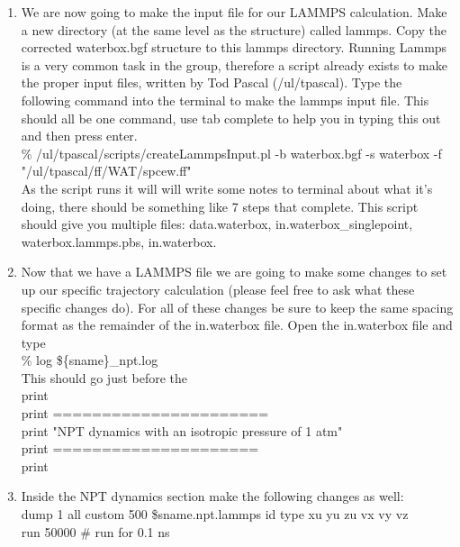 \documentclass{article}
\begin{document}
\begin{enumerate}
\item We are now going to make the input file for our LAMMPS calculation. 
Make a new directory (at the same level as the structure) called lammps.
Copy the corrected waterbox.bgf structure to this lammps directory.
Running Lammps is a very common task in the group, therefore a script already exists to make the proper input files, written by Tod Pascal (/ul/tpascal).
Type the following command into the terminal to make the lammps input file.
This should all be one command, use tab complete to help you in typing this out and then press enter. \\

\% /ul/tpascal/scripts/createLammpsInput.pl -b waterbox.bgf -s waterbox -f "/ul/tpascal/ff/WAT/spcew.ff"\\

As the script runs it will will write some notes to terminal about what it's doing, there should be something like 7 steps that complete. 
This script should give you multiple files: data.waterbox, in.waterbox\_singlepoint, waterbox.lammps.pbs, in.waterbox.\\

\item Now that we have a LAMMPS file we are going to make some changes to set up our specific trajectory calculation (please feel free to ask what these specific changes do).
For all of these changes be sure to keep the same spacing format as the remainder of the in.waterbox file. 
Open the in.waterbox file and type\\
\% log \hspace{10mm}  \$\{sname\}\_npt.log\\
This should go just before the \\
print \\
print ======================\\
print "NPT dynamics with an isotropic pressure of 1 atm"\\
print =====================\\
print\\

\item Inside the NPT dynamics section make the following changes as well:\\
dump \hspace{10mm} 1 all custom  500 \${sname}.npt.lammps id type xu yu zu vx vy vz\\
run     \hspace{10mm}     50000 \# run for  0.1 ns\\


\end{enumerate}
\end{document}
